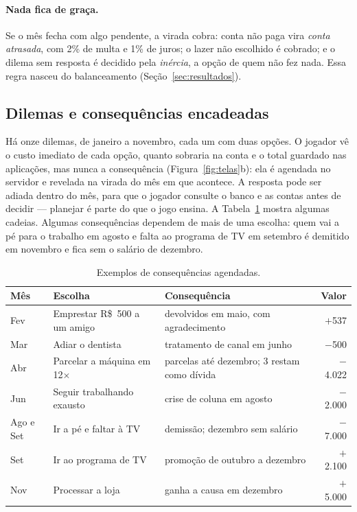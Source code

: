 \documentclass[11pt,a4paper]{article}
\begin{document}
\paragraph{Nada fica de graça.} Se o mês fecha com algo pendente, a virada cobra: conta não paga vira \emph{conta atrasada}, com 2\% de multa e 1\% de juros; o lazer não escolhido é cobrado; e o dilema sem resposta é decidido pela \emph{inércia}, a opção de quem não fez nada. Essa regra nasceu do balanceamento (Seção~\ref{sec:resultados}).

\subsection{Dilemas e consequências encadeadas}

Há onze dilemas, de janeiro a novembro, cada um com duas opções. O jogador vê o custo imediato de cada opção, quanto sobraria na conta e o total guardado nas aplicações, mas nunca a consequência (Figura~\ref{fig:telas}b): ela é agendada no servidor e revelada na virada do mês em que acontece. A resposta pode ser adiada dentro do mês, para que o jogador consulte o banco e as contas antes de decidir --- planejar é parte do que o jogo ensina. A Tabela~\ref{tab:consequencias} mostra algumas cadeias. Algumas consequências dependem de mais de uma escolha: quem vai a pé para o trabalho em agosto e falta ao programa de TV em setembro é demitido em novembro e fica sem o salário de dezembro.

\begin{table}[ht]
  \centering\small
  \caption{Exemplos de consequências agendadas.}
  \label{tab:consequencias}
  \begin{tabularx}{\linewidth}{@{}l X X r@{}}
    \toprule
    Mês & Escolha & Consequência & Valor \\
    \midrule
    Fev & Emprestar R\$~500 a um amigo & devolvidos em maio, com agradecimento & $+$537 \\
    Mar & Adiar o dentista & tratamento de canal em junho & $-$500 \\
    Abr & Parcelar a máquina em 12$\times$ & parcelas até dezembro; 3 restam como dívida & $-$4.022 \\
    Jun & Seguir trabalhando exausto & crise de coluna em agosto & $-$2.000 \\
    Ago e Set & Ir a pé e faltar à TV & demissão; dezembro sem salário & $-$7.000 \\
    Set & Ir ao programa de TV & promoção de outubro a dezembro & $+$2.100 \\
    Nov & Processar a loja & ganha a causa em dezembro & $+$5.000 \\
    \bottomrule
  \end{tabularx}
\end{table}
\end{document}
